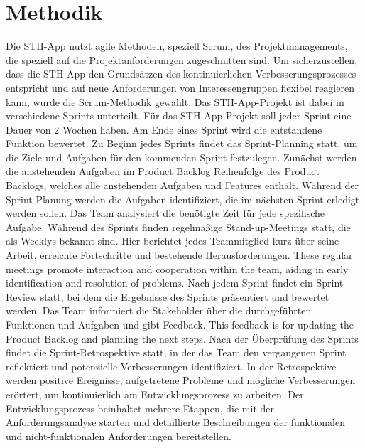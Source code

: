 \section{Methodik}
Die STH-App nutzt agile Methoden, speziell Scrum, des Projektmanagements, die speziell auf die Projektanforderungen zugeschnitten sind.
Um sicherzustellen, dass die STH-App den Grundsätzen des kontinuierlichen Verbesserungsprozesses entspricht und auf neue Anforderungen von Interessengruppen flexibel reagieren kann, wurde die Scrum-Methodik gewählt.
Das STH-App-Projekt ist dabei in verschiedene Sprints unterteilt.
Für das STH-App-Projekt soll jeder Sprint eine Dauer von 2 Wochen haben.
Am Ende eines Sprint wird die entstandene Funktion bewertet.
Zu Beginn jedes Sprints findet das Sprint-Planning statt, um die Ziele und Aufgaben für den kommenden Sprint festzulegen.
Zunächst werden die anstehenden Aufgaben im Product Backlog Reihenfolge des Product Backlogs, welches alle anstehenden Aufgaben und Features enthält.
Während der Sprint-Planung werden die Aufgaben identifiziert, die im nächsten Sprint erledigt werden sollen. Das Team analysiert die benötigte Zeit für jede spezifische Aufgabe.
Während des Sprints finden regelmäßige Stand-up-Meetings statt, die als Weeklys bekannt sind. Hier berichtet jedes Teammitglied kurz über seine Arbeit, erreichte Fortschritte und bestehende Herausforderungen.
These regular meetings promote interaction and cooperation within the team, aiding in early identification and resolution of problems.
Nach jedem Sprint findet ein Sprint-Review statt, bei dem die Ergebnisse des Sprints präsentiert und bewertet werden.
Das Team informiert die Stakeholder über die durchgeführten Funktionen und Aufgaben und gibt Feedback.
This feedback is for updating the Product Backlog and planning the next steps.
Nach der Überprüfung des Sprints findet die Sprint-Retrospektive statt, in der das Team den vergangenen Sprint reflektiert und potenzielle Verbesserungen identifiziert.
In der Retrospektive werden positive Ereignisse, aufgetretene Probleme und mögliche Verbesserungen erörtert, um kontinuierlich am Entwicklungsprozess zu arbeiten.
Der Entwicklungsprozess beinhaltet mehrere Etappen, die mit der Anforderungsanalyse starten und detaillierte Beschreibungen der funktionalen und nicht-funktionalen Anforderungen bereitstellen.
